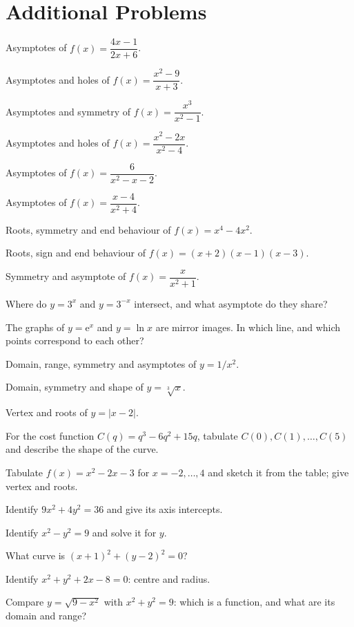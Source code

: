 \section{Additional Problems}

\begin{problems}
  \item Asymptotes of $f(x)=\dfrac{4x-1}{2x+6}$.
  \item Asymptotes and holes of $f(x)=\dfrac{x^{2}-9}{x+3}$.
  \item Asymptotes and symmetry of $f(x)=\dfrac{x^{3}}{x^{2}-1}$.
  \item Asymptotes and holes of $f(x)=\dfrac{x^{2}-2x}{x^{2}-4}$.
  \item Asymptotes of $f(x)=\dfrac{6}{x^{2}-x-2}$.
  \item Asymptotes of $f(x)=\dfrac{x-4}{x^{2}+4}$.
  \item Roots, symmetry and end behaviour of $f(x)=x^{4}-4x^{2}$.
  \item Roots, sign and end behaviour of $f(x)=(x+2)(x-1)(x-3)$.
  \item Symmetry and asymptote of $f(x)=\dfrac{x}{x^{2}+1}$.
  \item Where do $y=3^{x}$ and $y=3^{-x}$ intersect, and what asymptote do
        they share?
  \item The graphs of $y=\mathrm{e}^{x}$ and $y=\ln x$ are mirror images.
        In which line, and which points correspond to each other?
  \item Domain, range, symmetry and asymptotes of $y=1/x^{2}$.
  \item Domain, symmetry and shape of $y=\sqrt[3]{x}$.
  \item Vertex and roots of $y=|x-2|$.
  \item For the cost function $C(q)=q^{3}-6q^{2}+15q$, tabulate
        $C(0),C(1),\dots,C(5)$ and describe the shape of the curve.
  \item Tabulate $f(x)=x^{2}-2x-3$ for $x=-2,\dots,4$ and sketch it from
        the table; give vertex and roots.
  \item Identify $9x^{2}+4y^{2}=36$ and give its axis intercepts.
  \item Identify $x^{2}-y^{2}=9$ and solve it for $y$.
  \item What curve is $(x+1)^{2}+(y-2)^{2}=0$?
  \item Identify $x^{2}+y^{2}+2x-8=0$: centre and radius.
  \item Compare $y=\sqrt{9-x^{2}}$ with $x^{2}+y^{2}=9$: which is a
        function, and what are its domain and range?

\end{problems}
